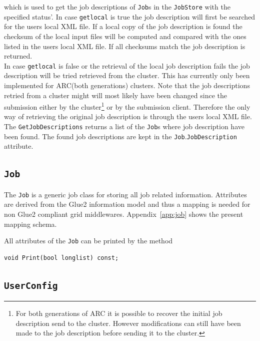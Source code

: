 \documentclass{book}
\newcommand{\Job}{\texttt{Job}}
\newcommand{\UserConfig}{\texttt{UserConfig}}
\begin{document}
which is used to get the job descriptions of {\Job}s in the \texttt{JobStore} 
with the specified status'. In case \texttt{getlocal} is true the job description 
will first be searched for the users local XML file. If a local copy of 
the job description is found the checksum of the local input files will be 
computed and compared with the ones listed in the users local XML file. If 
all checksums match the job description is returned.\\
In case \texttt{getlocal} is false or the retrieval of the local job description 
fails the job description will be tried retrieved from the cluster. This has 
currently only been implemented for ARC(both generations) clusters. Note 
that the job descriptions retried from a cluster might will most likely have 
been changed since the submission either by the cluster\footnote{For both 
generations of ARC it is possible to recover the initial job description send 
to the cluster. However modifications can still have been made to the 
job description before sending it to the cluster.} or by the submission 
client. Therefore the only way of retrieving the original job description is 
through the users local XML file.\\
The \texttt{GetJobDescriptions} returns a list of the  {\Job}s where job description 
have been found. The found job descriptions are kept in the 
{\Job}.\texttt{JobDescription} attribute.

\subsection{{\Job}}

The {\Job} is a generic job class for storing all job related
information. Attributes are derived from the Glue2 information model
and thus a mapping is needed for non Glue2 compliant grid middlewares.
Appendix~\ref{app:job} shows the present mapping schema.

All attributes of the {\Job} can be printed by the method

\begin{shaded}
\begin{verbatim}
void Print(bool longlist) const;
\end{verbatim}
\end{shaded}

\subsection{{\UserConfig}}
\end{document}
